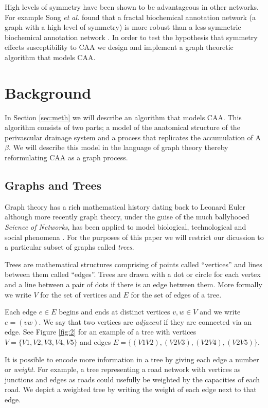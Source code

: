 \documentclass[10pt]{amsart} %
\theoremstyle{definition}
\begin{document}
High levels of symmetry have been shown to be advantageous in other networks.  For example Song \emph{et al.} found that a 
fractal biochemical annotation  network (a graph with a high level of symmetry) is more robust than a less symmetric 
biochemical annotation  network \cite{Song}.  In order to test the hypothesis that symmetry effects susceptibility to CAA we
design and implement a graph theoretic algorithm that models CAA.%


\section{Background}

In Section \ref{sec:meth} we will describe an algorithm that models CAA.  This algorithm consists of two parts; a model of the
anatomical structure of the perivascular drainage system and a process that replicates the accumulation of A$\beta$.  We will 
describe this model in the language of graph theory thereby reformulating CAA as a graph process.      

\subsection{Graphs and Trees}
Graph theory has a rich mathematical history dating back to Leonard Euler although more recently graph theory, under the guise
of the much ballyhooed \emph{Science of Networks}, has been applied to model biological, technological and social 
phenomena \cite{barabasi}. For the purposes of this paper we will restrict our dicussion to a particular subset of graphs 
called \emph{trees}.   

Trees are mathematical structures comprising of points called ``vertices'' and lines between them called ``edges''.  Trees 
are drawn with a dot or circle for each vertex and a line between a pair of dots if there is an edge between them.  More formally we write $V$ for the set of vertices and $E$ for the set 
of edges of a tree.  

Each edge $e \in E$ begins and ends at distinct vertices $ v,w \in V$ and we write $e = (vw)$. We say that two vertices are 
\emph{adjacent} if they are connected via an edge. See Figure \ref{fig:2} for an example of a tree with vertices $V = \{V1,V2,V3,V4,V5\}$
and edges $E = \{(V1V2),(V2V3),(V2V4),(V2V5)\}$.

It is possible to encode more information in a tree by giving each edge a number or \emph{weight}.  For example, a tree 
representing a road network with vertices as junctions and edges as roads could usefully be weighted by the capacities of 
each road.  We depict a weighted tree by writing the weight of each edge next to that edge.  
\end{document}
